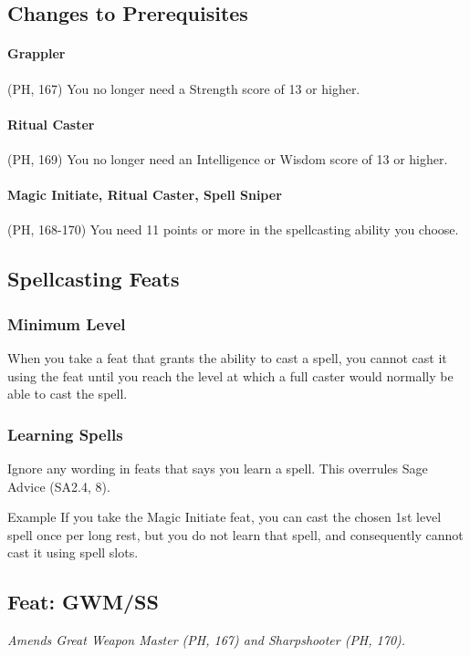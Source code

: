 \documentclass[letterpaper,twocolumn,openany,nodeprecatedcode]{dndbook}
\begin{document}
\subsection{Changes to Prerequisites}

\paragraph{Grappler} (PH, 167) You no longer need a Strength score of 13 or higher.

\paragraph{Ritual Caster} (PH, 169) You no longer need an Intelligence or Wisdom score of 13 or higher.

\paragraph{Magic Initiate, Ritual Caster, Spell Sniper} (PH, 168-170) You need 11 points or more in the spellcasting ability you choose.

\subsection{Spellcasting Feats}

\subsubsection{Minimum Level}
When you take a feat that grants the ability to cast a spell, you cannot cast it using the feat until you reach the level at which a full caster would normally be able to cast the spell.

\subsubsection{Learning Spells}
Ignore any wording in feats that says you learn a spell. This overrules Sage Advice (SA2.4, 8).

\begin{DndComment}{Example}
If you take the Magic Initiate feat, you can cast the chosen 1st level spell once per long rest, but you do not learn that spell, and consequently cannot cast it using spell slots.
\end{DndComment}


\subsection{Feat: GWM/SS}
\textit{Amends Great Weapon Master (PH, 167) and Sharpshooter (PH, 170).}
\end{document}
